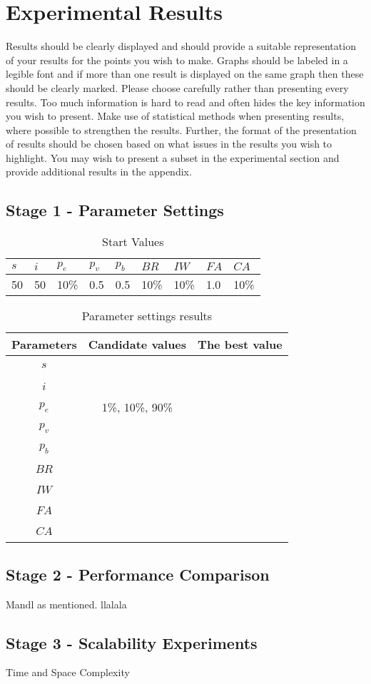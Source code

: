 \section{Experimental Results}

Results should be clearly displayed and should provide a suitable representation of your results for the points you wish to make. Graphs should be labeled in a legible font and if more than one result is displayed on the same graph then these should be clearly marked.   Please choose carefully rather than presenting every results. Too much information is hard to read and often hides the key information you wish to present. Make use of statistical methods when presenting results, where possible to strengthen the results.  Further, the format of the presentation of results should be chosen based on what issues in the results you wish to highlight. You may wish to present a subset in the experimental section and provide additional results in the appendix.

\subsection{Stage 1 - Parameter Settings}
\label{subsec:parameterSettings_results}

\begin{table}[H]
	\centering
    \begin{tabular}{|l|l|l|l|l|l|l|l|l|}
 	\hline
 	$s$ & $i$ & $p_{e}$ & $p_{v}$ & $p_{b}$ & $BR$  & $IW$ & $FA$ & $CA$  \\
 	\hline
    50 & 50 & 10\% & 0.5 & 0.5 & 10\% & 10\% & 1.0 & 10\%  \\
	\hline
    \end{tabular}
    \caption {Start Values}
    \label{table:parameter_startvalues}
	\end{table}

	\begin{table}[H]
	\centering
    \begin{tabular}{|c|c||c|}
 	\hline
 	Parameters & Candidate values & The best value\\
 	\hline
    $s$ & ~ & ~ \\
    $i$ & ~ & ~ \\
    $p_{e}$ & 1\%, 10\%, 90\% & ~ \\
    $p_{v}$ & ~ & ~ \\
    $p_{b}$ & ~ & ~ \\
    $BR$ & ~ & ~ \\
    $IW$ & ~ & ~ \\
    $FA$ & ~ & ~ \\
    $CA$ & ~ & ~ \\
	\hline
    \end{tabular}
    \caption {Parameter settings results}
    \label{table:parameterSettings2}
	\end{table}

\subsection{Stage 2 - Performance Comparison}

Mandl as mentioned. llalala

\subsection{Stage 3 -  Scalability Experiments}
Time and Space Complexity